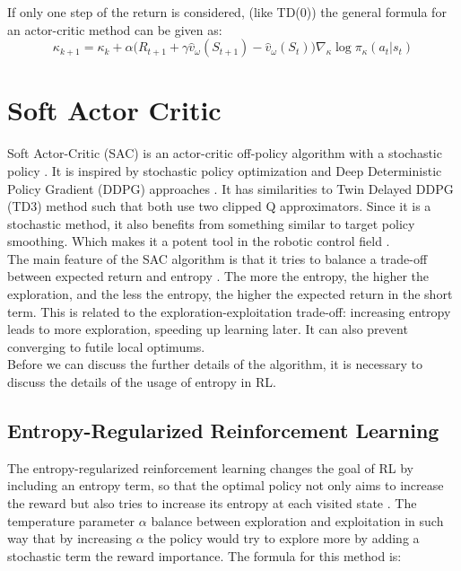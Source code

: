 If only one step of the return is considered, (like TD(0)) the general formula for an actor-critic method can be given as:
\begin{equation}
	\kappa_{k+1}=\kappa_k+\alpha \big(R_{t+1}+\gamma \hat{v}_\omega (S_{t+1})-\hat{v}_\omega(S_t)\big) \nabla_{\kappa}   \log \pi_{\kappa}(a_t|s_t)
\end{equation}

\section{Soft Actor Critic} \label{sacsection}

Soft Actor-Critic (SAC) is an actor-critic off-policy algorithm with a stochastic policy \cite{haarnoja2019soft,haarnoja2018soft}. It is inspired by stochastic policy optimization and Deep Deterministic Policy Gradient (DDPG) approaches \cite{lillicrap2015continuous}. It has similarities to Twin Delayed DDPG (TD3)  method \cite{fujimoto2018addressing} such that both use two clipped Q approximators. Since it is a stochastic method, it also benefits from something similar to target policy smoothing. Which makes it a potent tool in the robotic control field \cite{haarnoja2019learning}.\\


The main feature of the SAC algorithm is that it tries to balance a trade-off between expected return and entropy \cite{gray2011entropy}. The more the entropy, the higher the exploration, and the less the entropy, the higher the expected return in the short term. This is related to the exploration-exploitation trade-off: increasing entropy leads to more exploration, speeding up learning later. It can also prevent converging to futile local optimums.\\

Before we can discuss the further details of the algorithm, it is necessary to discuss the details of the usage of entropy in RL.
\subsection{Entropy-Regularized Reinforcement Learning}
The entropy-regularized reinforcement learning changes the goal of RL by including an entropy term, so that the optimal policy not only aims to increase the reward but also tries to increase its entropy at each visited state \cite{haarnoja2017reinforcement}. The temperature parameter $\alpha$ balance between exploration and exploitation in such way that by increasing $\alpha$ the policy would try to explore more by adding a stochastic term the reward importance. The formula for this method is:

